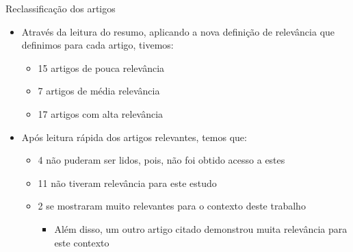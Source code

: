 \documentclass[brazilian]{beamer}
\begin{document}
\begin{frame}{Reclassificação dos artigos}
    \begin{itemize}
        \item Através da leitura do resumo, aplicando a nova definição de relevância que definimos para cada artigo, tivemos:
        \begin{itemize}
            \item 15 artigos de pouca relevância
            \item 7 artigos de média relevância
            \item 17 artigos com alta relevância
        \end{itemize}
        \item Após leitura rápida dos artigos relevantes, temos que:
        \begin{itemize}
            \item 4 não puderam ser lidos, pois, não foi obtido acesso a estes
            \item 11 não tiveram relevância para este estudo
            \item 2 se mostraram muito relevantes para o contexto deste trabalho
            \begin{itemize}
                \item Além disso, um outro artigo citado demonstrou muita relevância para este contexto
            \end{itemize}
        \end{itemize}
    \end{itemize}
\end{frame}
\end{document}
